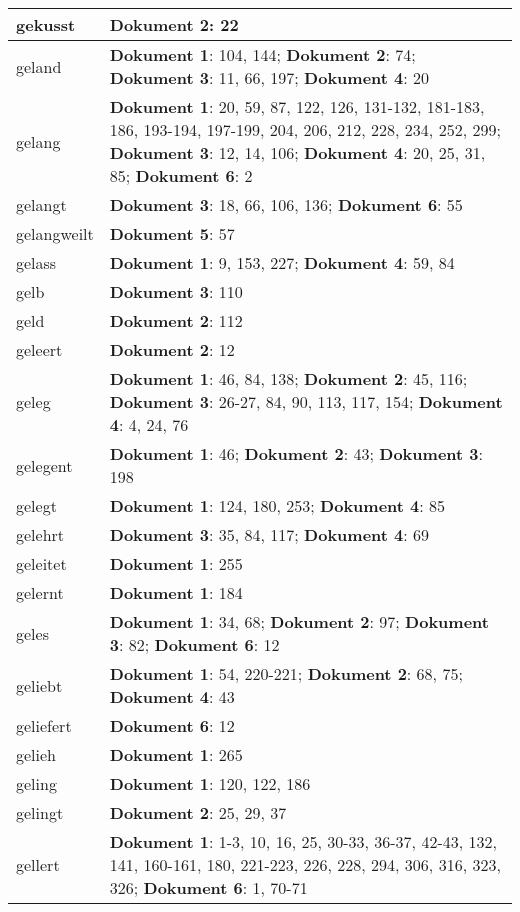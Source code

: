 \documentclass[a5paper]{article}
\begin{document}
\begin{longtable}[l]{|l|p{3in}|}
\hline
gekusst & \textbf{Dokument 2}: 22 \\
\hline
geland & \textbf{Dokument 1}: 104, 144; \textbf{Dokument 2}: 74; \textbf{Dokument 3}: 11, 66, 197; \textbf{Dokument 4}: 20 \\
\hline
gelang & \textbf{Dokument 1}: 20, 59, 87, 122, 126, 131-132, 181-183, 186, 193-194, 197-199, 204, 206, 212, 228, 234, 252, 299; \textbf{Dokument 3}: 12, 14, 106; \textbf{Dokument 4}: 20, 25, 31, 85; \textbf{Dokument 6}: 2 \\
\hline
gelangt & \textbf{Dokument 3}: 18, 66, 106, 136; \textbf{Dokument 6}: 55 \\
\hline
gelangweilt & \textbf{Dokument 5}: 57 \\
\hline
gelass & \textbf{Dokument 1}: 9, 153, 227; \textbf{Dokument 4}: 59, 84 \\
\hline
gelb & \textbf{Dokument 3}: 110 \\
\hline
geld & \textbf{Dokument 2}: 112 \\
\hline
geleert & \textbf{Dokument 2}: 12 \\
\hline
geleg & \textbf{Dokument 1}: 46, 84, 138; \textbf{Dokument 2}: 45, 116; \textbf{Dokument 3}: 26-27, 84, 90, 113, 117, 154; \textbf{Dokument 4}: 4, 24, 76 \\
\hline
gelegent & \textbf{Dokument 1}: 46; \textbf{Dokument 2}: 43; \textbf{Dokument 3}: 198 \\
\hline
gelegt & \textbf{Dokument 1}: 124, 180, 253; \textbf{Dokument 4}: 85 \\
\hline
gelehrt & \textbf{Dokument 3}: 35, 84, 117; \textbf{Dokument 4}: 69 \\
\hline
geleitet & \textbf{Dokument 1}: 255 \\
\hline
gelernt & \textbf{Dokument 1}: 184 \\
\hline
geles & \textbf{Dokument 1}: 34, 68; \textbf{Dokument 2}: 97; \textbf{Dokument 3}: 82; \textbf{Dokument 6}: 12 \\
\hline
geliebt & \textbf{Dokument 1}: 54, 220-221; \textbf{Dokument 2}: 68, 75; \textbf{Dokument 4}: 43 \\
\hline
geliefert & \textbf{Dokument 6}: 12 \\
\hline
gelieh & \textbf{Dokument 1}: 265 \\
\hline
geling & \textbf{Dokument 1}: 120, 122, 186 \\
\hline
gelingt & \textbf{Dokument 2}: 25, 29, 37 \\
\hline
gellert & \textbf{Dokument 1}: 1-3, 10, 16, 25, 30-33, 36-37, 42-43, 132, 141, 160-161, 180, 221-223, 226, 228, 294, 306, 316, 323, 326; \textbf{Dokument 6}: 1, 70-71 \\

\end{longtable}
\end{document}
